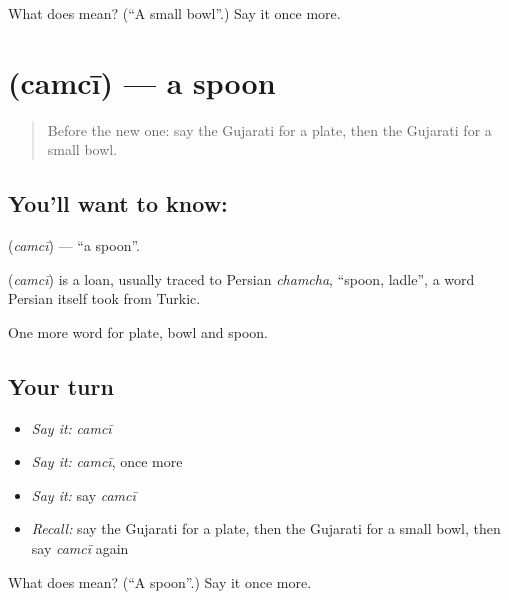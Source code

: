 \begin{tcolorbox}[breakable,colback=teal!4,colframe=teal!35!black,title={Before you move on}]
What does  mean? (\textquotedblleft{}A small bowl\textquotedblright{}.) Say it once more.
\end{tcolorbox}
\section[\texorpdfstring{\gu{ચમચી} (camcī)}{ચમચી (camcī)}]{ (camcī) — a spoon}

\label{lesson:GU-C61-spoon}



\begin{quote}
Before the new one: say the Gujarati for a plate, then the Gujarati for a small bowl.
\end{quote}

\subsection*{You'll want to know: }
\textbf{} (\emph{camcī}) — \textquotedblleft{}a spoon\textquotedblright{}.

\begin{cousinweb}
\textbf{} (\emph{camcī}) is a loan, usually traced to Persian \emph{chamcha}, \textquotedblleft{}spoon, ladle\textquotedblright{}, a word Persian itself took from Turkic.
\end{cousinweb}

\begin{grammarlens}[title={What you've built}]
One more word for plate, bowl and spoon.
\end{grammarlens}

\subsection*{Your turn}
\begin{itemize}
\raggedright
  \item \emph{Say it:} \emph{camcī}
  \item \emph{Say it:} \emph{camcī}, once more
  \item \emph{Say it:} say \emph{camcī}
  \item \emph{Recall:} say the Gujarati for a plate, then the Gujarati for a small bowl, then say \emph{camcī} again
\end{itemize}

\begin{tcolorbox}[breakable,colback=teal!4,colframe=teal!35!black,title={Before you move on}]
What does  mean? (\textquotedblleft{}A spoon\textquotedblright{}.) Say it once more.
\end{tcolorbox}
